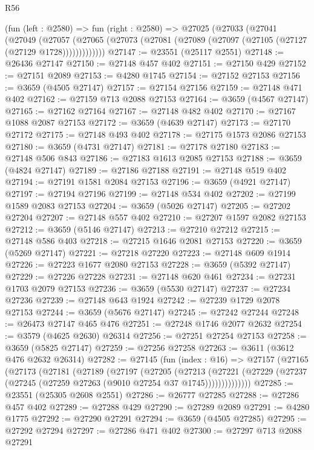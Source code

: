 \begin{lexlean}{R56}
\begin{coremodule}
    (fun (left : @2580) =>
    fun (right : @2580) =>
    @27025
      (@27033
        (@27041
          (@27049
            (@27057
              (@27065 (@27073 (@27081 (@27089 (@27097 (@27105 (@27127 (@27129 @1728)))))))))))))
@27147 := @23551 (@25117 @2551)
@27148 := @26436 @27147
@27150 := @27148 @457 @402
@27151 := @27150 @429
@27152 := @27151 @2089
@27153 := @4280 @1745
@27154 := @27152 @27153
@27156 := @3659 (@4505 @27147)
@27157 := @27154 @27156
@27159 := @27148 @471 @402
@27162 := @27159 @713 @2088 @27153
@27164 := @3659 (@4567 @27147)
@27165 := @27162 @27164
@27167 := @27148 @482 @402
@27170 := @27167 @1088 @2087 @27153
@27172 := @3659 (@4639 @27147)
@27173 := @27170 @27172
@27175 := @27148 @493 @402
@27178 := @27175 @1573 @2086 @27153
@27180 := @3659 (@4731 @27147)
@27181 := @27178 @27180
@27183 := @27148 @506 @843
@27186 := @27183 @1613 @2085 @27153
@27188 := @3659 (@4824 @27147)
@27189 := @27186 @27188
@27191 := @27148 @519 @402
@27194 := @27191 @1581 @2084 @27153
@27196 := @3659 (@4921 @27147)
@27197 := @27194 @27196
@27199 := @27148 @534 @402
@27202 := @27199 @1589 @2083 @27153
@27204 := @3659 (@5026 @27147)
@27205 := @27202 @27204
@27207 := @27148 @557 @402
@27210 := @27207 @1597 @2082 @27153
@27212 := @3659 (@5146 @27147)
@27213 := @27210 @27212
@27215 := @27148 @586 @403
@27218 := @27215 @1646 @2081 @27153
@27220 := @3659 (@5269 @27147)
@27221 := @27218 @27220
@27223 := @27148 @609 @1914
@27226 := @27223 @1677 @2080 @27153
@27228 := @3659 (@5392 @27147)
@27229 := @27226 @27228
@27231 := @27148 @620 @461
@27234 := @27231 @1703 @2079 @27153
@27236 := @3659 (@5530 @27147)
@27237 := @27234 @27236
@27239 := @27148 @643 @1924
@27242 := @27239 @1729 @2078 @27153
@27244 := @3659 (@5676 @27147)
@27245 := @27242 @27244
@27248 := @26473 @27147 @465 @476
@27251 := @27248 @1746 @2077 @2632
@27254 := @3579 (@4625 @2630) @26314
@27256 := @27251 @27254 @27153
@27258 := @3659 (@5825 @27147)
@27259 := @27256 @27258
@27263 := @3611 (@3612 @476 @2632 @26314)
@27282 := @27145
    (fun (index : @16) =>
    @27157
      (@27165
        (@27173
          (@27181
            (@27189
              (@27197
                (@27205
                  (@27213
                    (@27221
                      (@27229 (@27237 (@27245 (@27259 @27263 (@9010 @27254 @37 @1745))))))))))))))
@27285 := @23551 (@25305 @2608 @2551)
@27286 := @26777 @27285
@27288 := @27286 @457 @402
@27289 := @27288 @429
@27290 := @27289 @2089
@27291 := @4280 @1775
@27292 := @27290 @27291
@27294 := @3659 (@4505 @27285)
@27295 := @27292 @27294
@27297 := @27286 @471 @402
@27300 := @27297 @713 @2088 @27291

\end{coremodule}
\end{lexlean}
